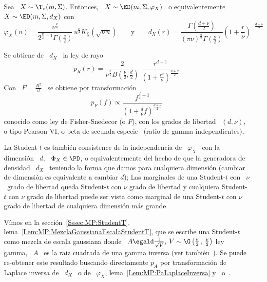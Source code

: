 \begin{ejemplo}
%
  Sea \ $X \sim \T_\nu(m,\Sigma)$.  Entonces, \ $X \sim \ED(m,\Sigma,\varphi_X)$
  \ o equivalentemente \ $X \sim \ED(m,\Sigma,d_X)$ con
  \[
  \varphi_X(u)   =  \frac{\nu^{\frac{\nu}{4}}}{2^{\frac{\nu}{2}-1}  \Gamma\left(
      \frac{\nu}{2}   \right)}   \,  u^{\frac{\nu}{4}}   K_{\frac{\nu}{2}}\left(
    \sqrt{\nu \,  u} \right) \qquad \mbox{y} \qquad  d_X(r) = \frac{\Gamma\left(
      \frac{d+\nu}{2}      \right)}{(\pi     \nu)^{\frac{d}{2}}     \Gamma\left(
      \frac{\nu}{2}    \right)}   \left(    1    +   \frac{r}{\nu}    \right)^{-
    \frac{d+\nu}{2}}
  \]

  Se obtiene de \ $d_X$ \ la ley de rayo
  \[
  p_R(r)  =  \frac{2}{\nu^{\frac{d}{2}}   B\left(  \frac{\nu}{2}  ,  \frac{d}{2}
    \right)}      \:     \frac{r^{d-1}}{\left(      1      +     \frac{r^2}{\nu}
    \right)^{\frac{d+\nu}{2}}}
  \]
  Con \ $F = \frac{R^2}{d}$ \ se obtiene por transformaci\'on
  \[
  p_F(f)   \propto   \frac{f^{\frac{d}{2}-1}}{\left(   1   +   \frac{d}{\nu}   f
    \right)^{\frac{d+\nu}{2}}}
  \]
  conocido como  ley de Fisher-Snedecor  (o $F$), con  los grados de  libertad \
  $(d,\nu)$,  o tipo Pearson  VI, o  beta de  secunda especie~\cite{JohKot95:v2,
    Muk00, Bre88, IbaPer12} (ratio de gamma independientes).

  La Student-$t$ es tambi\'en consistence de la independencia de \ $\varphi_X$ \
  con la dimensi\'on \ $d$, \  $\Phi_X \in \PD$, o equivalentemente del hecho de
  que  la generadora de  densidad \  $d_X$ \  teniendo la  forma que  damos para
  cualquiera dimensi\'on (cambiar de  dimensi\'on es equivalente a cambiar $d$);
  Las  marginales de  una Student-$t$  con  \ $\nu$  \ grado  de libertad  queda
  Student-$t$ con  $\nu$ grado  de libertad y  cualquiera Student-$t$  con $\nu$
  grado de libertad  puede ser vista como marginal de  una Student-$t$ con $\nu$
  grado de libertad de cualquiera dimensi\'on m\'as grande.

  V\'imos           en           la           secci\'on~\ref{Sssec:MP:StudentT},
  lema~\ref{Lem:MP:MezclaGaussianaEscalaStudentT},    que    se   escribe    una
  Student-$t$   como   mezcla   de   escala   gaussiana  donde   \   $A   \egald
  \frac{1}{\sqrt{V}},  \: V \sim  \G\left( \frac{\nu}{2}  \, ,  \, \frac{\nu}{2}
  \right)$ ley gamma, \ie \ $A$ \  es la raiz cuadrada de una gamma inversa (ver
  tambi\'en~\cite{FanKot90,  KotNad04}).   Se  puede re-obtener  este  resultado
  buscando directamente $p_A$ por transformaci\'on de Laplace inversa de \ $d_X$
  \  o  de  \  $\varphi_X$,  lema~\ref{Lem:MP:PaLaplaceInversa}  y~\cite[Cap.~5,
  Tab.~A.5.1, Ec.~14]{Pou10} o~\cite[Cap.~2, Tab.~2.3, Ec.~14]{Pou99}.
%
\end{ejemplo}


